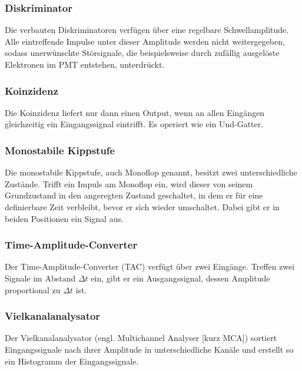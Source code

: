 \subsubsection{Diskriminator}

Die verbauten Diskriminatoren verfügen über eine regelbare Schwellamplitude. Alle eintreffende Impulse unter dieser Amplitude werden nicht weitergegeben, sodass unerwünschte Störsignale,
die beispielsweise durch zufällig ausgelöste Elektronen im PMT entstehen, unterdrückt.


\subsubsection{Koinzidenz}

Die Koinzidenz liefert nur dann einen Output, wenn an allen Eingängen gleichzeitig ein Eingangssignal eintrifft.
Es operiert wie ein Und-Gatter.

\subsubsection{Monostabile Kippstufe}

Die monostabile Kippstufe, auch Monoflop genannt, besitzt zwei unterschiedliche Zustände. Trifft ein Impuls am Monoflop ein, wird dieser von seinem Grundzustand in den angeregten Zustand geschaltet,
in dem er für eine definierbare Zeit verbleibt, bevor er sich wieder umschaltet. Dabei gibt er in beiden Positionen ein Signal aus.


\subsubsection{Time-Amplitude-Converter}

Der Time-Amplitude-Converter (TAC) verfügt über zwei Eingänge. Treffen zwei Signale im Abstand $\Delta t$ ein, gibt er ein Ausgangssignal, dessen Amplitude proportional zu $\Delta t$  ist.


\subsubsection{Vielkanalanalysator}

Der Vielkanalanalysator (engl. Multichannel Analyser [kurz MCA]) sortiert Eingangssignale nach ihrer Amplitude in unterschiedliche Kanäle und erstellt so ein Histogramm der Eingangssignale.





